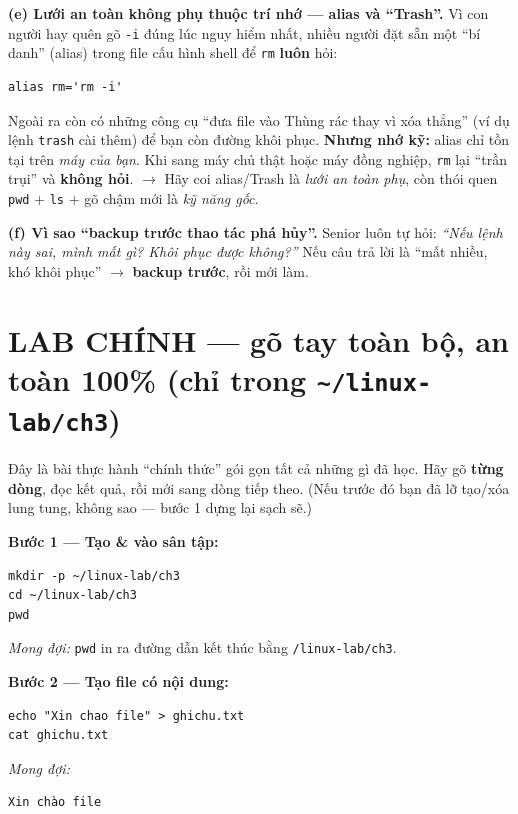 \documentclass[12pt,a4paper]{article}
\newcommand{\cmd}[1]{\texttt{#1}}
\begin{document}
\begin{seniorbox}[title={Góc Senior \#4 --- quoting, \texttt{-{}-}, idempotent, alias an toàn, và vì sao ``biến rỗng'' giết cả hệ thống}]
\vspace{0.5em}
\textbf{(e) Lưới an toàn không phụ thuộc trí nhớ --- alias và ``Trash''.} Vì con người hay quên gõ \cmd{-i} đúng lúc nguy hiểm nhất, nhiều người đặt sẵn một ``bí danh'' (alias) trong file cấu hình shell để \cmd{rm} \textbf{luôn} hỏi:
\begin{Verbatim}
alias rm='rm -i'
\end{Verbatim}
Ngoài ra còn có những công cụ ``đưa file vào Thùng rác thay vì xóa thẳng'' (ví dụ lệnh \cmd{trash} cài thêm) để bạn còn đường khôi phục. \textbf{Nhưng nhớ kỹ:} alias chỉ tồn tại trên \textit{máy của bạn}. Khi sang máy chủ thật hoặc máy đồng nghiệp, \cmd{rm} lại ``trần trụi'' và \textbf{không hỏi}. $\rightarrow$ Hãy coi alias/Trash là \textit{lưới an toàn phụ}, còn thói quen \cmd{pwd} + \cmd{ls} + gõ chậm mới là \textit{kỹ năng gốc}.

\vspace{0.5em}
\textbf{(f) Vì sao ``backup trước thao tác phá hủy''.} Senior luôn tự hỏi: \textit{``Nếu lệnh này sai, mình mất gì? Khôi phục được không?''} Nếu câu trả lời là ``mất nhiều, khó khôi phục'' $\rightarrow$ \textbf{backup trước}, rồi mới làm.
\end{seniorbox}

\section{LAB CHÍNH --- gõ tay toàn bộ, an toàn 100\% (chỉ trong \texttt{\textasciitilde/linux-lab/ch3})}

\begin{labbox}[title={Thực hành ngay --- Lab chính}]
Đây là bài thực hành ``chính thức'' gói gọn tất cả những gì đã học. Hãy gõ \textbf{từng dòng}, đọc kết quả, rồi mới sang dòng tiếp theo. (Nếu trước đó bạn đã lỡ tạo/xóa lung tung, không sao --- bước 1 dựng lại sạch sẽ.)
\end{labbox}

\textbf{Bước 1 --- Tạo \& vào sân tập:}
\begin{Verbatim}
mkdir -p ~/linux-lab/ch3
cd ~/linux-lab/ch3
pwd
\end{Verbatim}
\textit{Mong đợi:} \cmd{pwd} in ra đường dẫn kết thúc bằng \cmd{/linux-lab/ch3}.

\textbf{Bước 2 --- Tạo file có nội dung:}
\begin{Verbatim}
echo "Xin chao file" > ghichu.txt
cat ghichu.txt
\end{Verbatim}
\textit{Mong đợi:}
\begin{Verbatim}
Xin chào file
\end{Verbatim}
\end{document}
